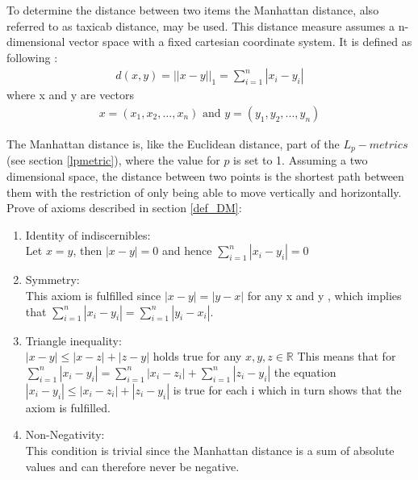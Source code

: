 To determine the distance between two items the Manhattan distance, also referred to as taxicab distance, may be used. This distance measure assumes a n-dimensional vector space with a fixed cartesian coordinate system. It is defined as following \cite{Craw2010}:
\begin{align}
	d(x,y) = ||x-y||_1 = \sum\limits_{i=1}^{n}|x_i - y_i|
\end{align}
where x and y are vectors
\begin{align*}
	x = (x_1, x_2,..., x_n) \text{ and } y = (y_1, y_2,..., y_n)
\end{align*}

The Manhattan distance is, like the Euclidean distance, part of the $L_p-metrics$ (see section \ref{lpmetric}), where the value for $p$ is set to 1.
Assuming a two dimensional space, the distance between two points is the shortest path between them with the restriction of only being able to move vertically and horizontally.\\
Prove of axioms described in section \ref{def_DM}:\\
\begin{enumerate}
	\item Identity of indiscernibles:\\
	Let $x=y$, then $|x-y| = 0$ and hence $\sum\limits_{i=1}^{n}|x_i - y_i| = 0$
	\item Symmetry:\\
	This axiom is fulfilled since $|x-y| = |y-x|$ for any x and y , which implies that $\sum\limits_{i=1}^{n}|x_i - y_i| = \sum\limits_{i=1}^{n}|y_i - x_i|$.
	\item Triangle inequality:\\
	$|x-y| \leq |x-z|+|z-y|$ holds true for any $x,y,z \in \mathbb{R}$
	This means that for $\sum\limits_{i=1}^{n}|x_i - y_i| = \sum\limits_{i=1}^{n}|x_i - z_i| + \sum\limits_{i=1}^{n}|z_i - y_i|$ the equation $|x_i - y_i| \leq |x_i - z_i| + |z_i - y_i|$ is true for each i which in turn shows that the axiom is fulfilled.
	\item Non-Negativity:\\
	This condition is trivial since the Manhattan distance is a sum of absolute values and can therefore never be negative.
\end{enumerate}
